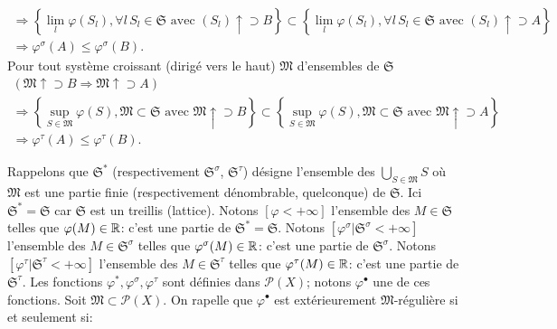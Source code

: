 \begin{demo}
\begin{enumerate}
\begin{multline*}
   \Rightarrow
   \left\lbrace \lim_l\varphi(S_l), \forall l\, S_l \in \mathfrak{S} \text{ avec } (S_l)\uparrow \supset B\right\rbrace
     \subset
  \left\lbrace \lim_l\varphi(S_l), \forall l\, S_l \in \mathfrak{S} \text{ avec } (S_l)\uparrow \supset A\right\rbrace \\
   \Rightarrow
   \varphi^\sigma(A) \leq \varphi^\sigma(B).
\end{multline*}
    Pour tout système croissant (dirigé vers le haut) $\mathfrak{M}$ d'ensembles de $\mathfrak{S}$
\begin{multline*}
 \left( \mathfrak{M}\uparrow \supset B \Rightarrow \mathfrak{M} \uparrow \supset A \right) \\
   \Rightarrow
   \left\lbrace \sup_{S \in \mathfrak{M}}\varphi(S), \mathfrak{M} \subset \mathfrak{S} \text{ avec } \mathfrak{M}\uparrow \supset B\right\rbrace
     \subset
  \left\lbrace \sup_{S \in \mathfrak{M}}\varphi(S), \mathfrak{M} \subset \mathfrak{S} \text{ avec } \mathfrak{M}\uparrow \supset A\right\rbrace \\
   \Rightarrow
   \varphi^\tau(A) \leq \varphi^\tau(B).
\end{multline*}
 \end{enumerate}
\end{demo}
\noindent Rappelons que $\mathfrak{S}^{*}$ (respectivement $\mathfrak{S}^{\sigma}$, $\mathfrak{S}^{\tau}$) désigne l'ensemble des $\bigcup_{S \in \mathfrak{M}}S$ où $\mathfrak{M}$ est une partie finie (respectivement dénombrable, quelconque) de $\mathfrak{S}$. Ici  $\mathfrak{S}^{*} = \mathfrak{S}$ car  $\mathfrak{S}$ est un treillis (lattice).\newline
Notons $[\varphi < +\infty]$ l'ensemble des $M \in \mathfrak{S}$ telles que $\varphi(M) \in \mathbb{R}$: c'est une partie de $\mathfrak{S}^{*} = \mathfrak{S}$.\newline
Notons $[\varphi^\sigma|\mathfrak{S}^{\sigma} < +\infty]$ l'ensemble des $M \in \mathfrak{S}^{\sigma}$ telles que $\varphi^\sigma(M) \in \mathbb{R}$: c'est une partie de $\mathfrak{S}^{\sigma}$.\newline
Notons $[\varphi^\tau|\mathfrak{S}^{\tau} < +\infty]$ l'ensemble des $M \in \mathfrak{S}^{\tau}$ telles que $\varphi^\tau(M) \in \mathbb{R}$: c'est une partie de $\mathfrak{S}^{\tau}$.\newline
Les fonctions $\varphi^*, \varphi^\sigma, \varphi^\tau$ sont définies dans $\mathcal{P}(X)$; notons $\varphi^\bullet$ une de ces fonctions.\newline
Soit $\mathfrak{M} \subset \mathcal{P}(X)$. On rapelle que $\varphi^\bullet$ est extérieurement $\mathfrak{M}$-régulière si et seulement si:
